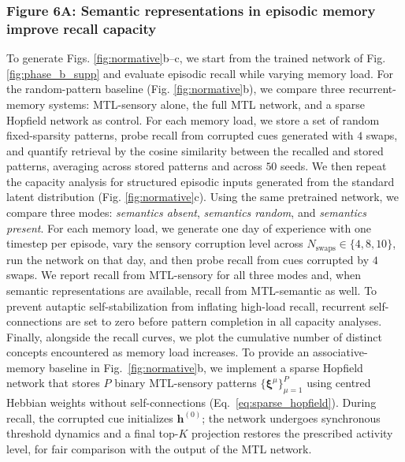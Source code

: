 \documentclass{article}
\begin{document}
\subsubsection*{Figure 6A: Semantic representations in episodic memory improve recall capacity}
To generate Figs. \ref{fig:normative}b--c, we start from the trained network of Fig. \ref{fig:phase_b_supp} and evaluate episodic recall while varying memory load. For the random-pattern baseline (Fig. \ref{fig:normative}b), we compare three recurrent-memory systems: MTL-sensory alone, the full MTL network, and a sparse Hopfield network as control. For each memory load, we store a set of random fixed-sparsity patterns, probe recall from corrupted cues generated with $4$ swaps, and quantify retrieval by the cosine similarity between the recalled and stored patterns, averaging across stored patterns and across $50$ seeds.
\newline\newline
We then repeat the capacity analysis for structured episodic inputs generated from the standard latent distribution (Fig. \ref{fig:normative}c). Using the same pretrained network, we compare three modes: \textit{semantics absent}, \textit{semantics random}, and \textit{semantics present}. For each memory load, we generate one day of experience with one timestep per episode, vary the sensory corruption level across $N_\textrm{swaps}\in\{4,8,10\}$, run the network on that day, and then probe recall from cues corrupted by $4$ swaps. We report recall from MTL-sensory for all three modes and, when semantic representations are available, recall from MTL-semantic as well. To prevent autaptic self-stabilization from inflating high-load recall, recurrent self-connections are set to zero before pattern completion in all capacity analyses. Finally, alongside the recall curves, we plot the cumulative number of distinct concepts encountered as memory load increases.
\newline\newline
To provide an associative-memory baseline in Fig.~\ref{fig:normative}b, we implement a sparse Hopfield network that stores $P$ binary MTL-sensory patterns $\{\boldsymbol{\xi}^{\mu}\}_{\mu=1}^{P}$ using centred Hebbian weights without self-connections (Eq.~\ref{eq:sparse_hopfield}). During recall, the corrupted cue initializes $\mathbf{h}^{(0)}$; the network undergoes synchronous threshold dynamics and a final top-$K$ projection restores the prescribed activity level, for fair comparison with the output of the MTL network.
\end{document}
